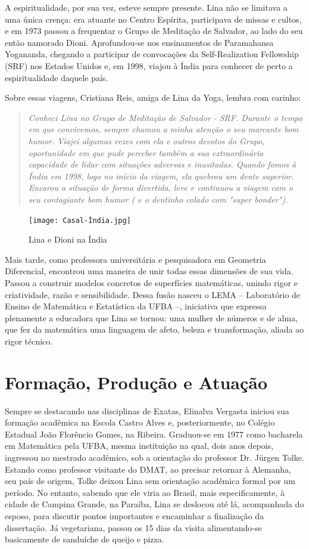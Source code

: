 \documentclass{hipatia}
\begin{document}
A espiritualidade, por sua vez, esteve sempre presente. Lina não se limitava a uma única crença: era atuante no Centro Espírita, participava de missas e cultos, e em 1973 passou a frequentar o Grupo de Meditação de Salvador, ao lado do seu então namorado Dioni. Aprofundou-se nos ensinamentos de Paramahansa Yogananda, chegando a participar de convocações da Self-Realization Fellowship (SRF) nos Estados Unidos e, em 1998, viajou à Índia para conhecer de perto a espiritualidade daquele país.  

Sobre essas viagens, Cristiana Reis, amiga de Lina da Yoga, lembra com carinho:
\begin{quote} \textit{Conheci Lina no Grupo de Meditação de Salvador - SRF. Durante o tempo em que convivemos, sempre chamou a minha atenção o seu marcante bom humor. Viajei algumas vezes com ela e outros devotos do Grupo, oportunidade em que pude perceber também a sua extraordinária capacidade de lidar com situações adversas e inusitadas. Quando fomos à Índia em 1998, logo no início da viagem, ela quebrou um dente superior. Encarou a situação de forma divertida, leve e continuou a viagem com o seu contagiante bom humor ( e o dentinho colado com "super bonder").}\end{quote}

\begin{figure}[htb!]
\texttt{[image: Casal-Índia.jpg]}
\caption{Lina e Dioni na Índia}   
\end{figure}
Mais tarde, como professora universitária e pesquisadora em Geometria Diferencial, encontrou uma maneira de unir todas essas dimensões de sua vida. Passou a construir modelos concretos de superfícies matemáticas, unindo rigor e criatividade, razão e sensibilidade. Dessa fusão nasceu o LEMA – Laboratório de Ensino de Matemática e Estatística da UFBA –, iniciativa que expressa plenamente a educadora que Lina se tornou: uma mulher de números e de alma, que fez da matemática uma linguagem de afeto, beleza e transformação, aliada ao rigor técnico. 
 
\section{Formação, Produção e Atuação}
Sempre se destacando nas disciplinas de Exatas, Elinalva Vergasta iniciou sua formação acadêmica na Escola Castro Alves e, posteriormente, no Colégio Estadual João Florêncio Gomes, na Ribeira. Graduou-se em 1977 como  bacharela em Matemática pela UFBA, mesma instituição na qual, dois anos depois, ingressou no mestrado acadêmico, sob a orientação do professor Dr. Jürgen Tolke. Estando como professor visitante do DMAT, ao precisar retornar à Alemanha, seu país de origem, Tolke deixou Lina sem orientação acadêmica formal por um período. No entanto, sabendo que ele viria ao Brasil, mais especificamente, à cidade de Campina Grande, na Paraíba, Lina se deslocou até lá, acompanhada do esposo, para discutir pontos importantes e encaminhar a finalização da dissertação. Já vegetariana, passou os 15 dias da visita alimentando-se basicamente de sanduíche de queijo e pizza. 
\end{document}
